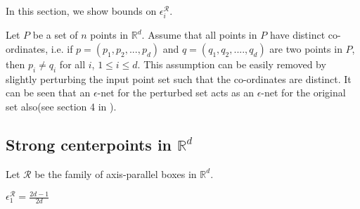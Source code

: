 \noindent In this section, we show bounds on $\epsilon_i^{\mathcal{R}}$.

 Let $P$ be a set of $n$ points in $\mathbb{R}^d$. Assume that all points in $P$
have distinct co-ordinates, i.e. if $p=(p_1,p_2,...,p_d)$ and $q=(q_1,q_2,....,q_d)$ are two points in $P$, then $p_i \neq q_i$ for all $i$, $1\leq i \leq d$. This assumption can be easily removed by slightly perturbing the input point set such that the co-ordinates are distinct. It can be seen that an $\epsilon$-net for the
perturbed set acts as an $\epsilon$-net for the original set also(see section 4
in \cite{AAH09}). 

\subsection{Strong centerpoints in $\mathbb{R}^d$}
\noindent Let $\mathcal{R}$ be the family of axis-parallel boxes in $\mathbb{R}^d$.
\begin{thm}\label{ddim}
 $\epsilon_1^{\mathcal{R}} = \frac{2d-1}{2d}$
\end{thm}
